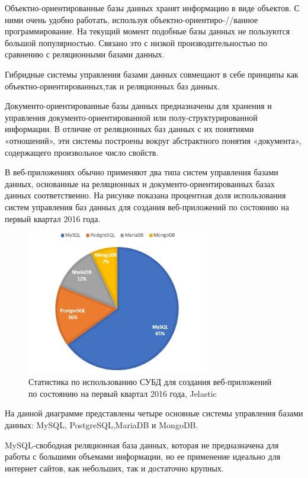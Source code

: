 \documentclass[a4paper,14pt]{extreport}
\theoremstyle{definition}
\begin{document}
Объектно-ориентированные базы данных хранят информацию в виде объектов\cite{Golitzina}. С ними очень удобно работать, используя объектно-ориентиро-//ванное программирование. На текущий момент подобные базы данных не пользуются большой популярностью. Связано это с низкой производительностью по сравнению с реляционными базами данных.

Гибридные системы управления базами данных совмещают в себе принципы как объектно-ориентированных,так и реляционных баз данных.

Документо-ориентированные базы данных предназначены для хранения и управления документо-ориентированной или полу-структурированной информации\cite{Fufaev}. В отличие от реляционных баз данных с их понятиями «отношений», эти системы построены вокруг абстрактного понятия «документа», содержащего произвольное число свойств.

В веб-приложениях обычно применяют два типа систем управления базами данных, основанные на реляционных и документо-ориентированных базах данных соответственно. На рисунке показана процентная доля использования систем управления баз данных для создания веб-приложений по состоянию на первый квартал 2016 года\cite{Jelastic}.

\begin{figure}[h!]
\begin{center}
\includegraphics[width=8cm]{48.png}
\caption{Статистика по использованию СУБД для создания веб-приложений по состоянию на первый квартал 2016 года, Jelastic}
\label{fig:3}
\end{center}
\end{figure}

На данной диаграмме представлены четыре основные системы управления базами данных: MySQL, PostgreSQL,MariaDB и MongoDB.

MySQL-свободная реляционная база данных, которая не предназначена для работы с большими объемами информации, но ее применение идеально для интернет сайтов, как небольших, так и достаточно крупных.
\end{document}
